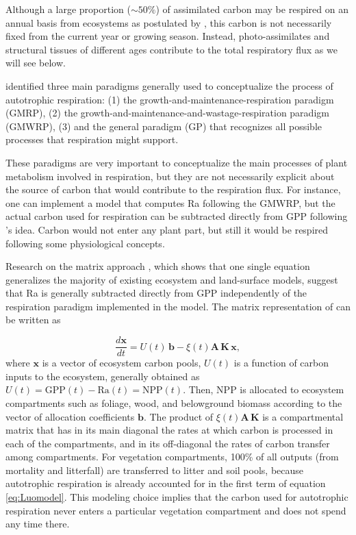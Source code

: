 \documentclass[12pt, a4paper]{article}
\begin{document}
Although a large proportion ($\sim 50\%$) of assimilated carbon may be respired on an annual basis from ecosystems as postulated by \citet{Waring1998}, this carbon is not necessarily fixed from the current year or growing season. Instead, photo-assimilates and structural tissues of different ages contribute to the total respiratory flux as we will see below.

\citet{Amthor2000} identified three main paradigms generally used to conceptualize the process of autotrophic respiration: (1) the growth-and-maintenance-respiration paradigm (GMRP), (2) the growth-and-maintenance-and-wastage-respiration paradigm (GMWRP), (3) and the general paradigm (GP) that recognizes all possible processes that respiration might support. 

These paradigms are very important to conceptualize the main processes of plant metabolism involved in respiration, but they are not necessarily explicit about the source of carbon that would contribute to the respiration flux. For instance, one can implement a model that computes Ra following the GMWRP, but the actual carbon used for respiration can be subtracted directly from GPP following \citeauthor{Waring1998}'s \citeyearpar{Waring1998} idea. Carbon would not enter any plant part, but still it would be respired following some physiological concepts. 

Research on the matrix approach \citep{Luo2017}, which shows that one single equation generalizes the majority of existing ecosystem and land-surface models, suggest that Ra is generally subtracted directly from GPP independently of the respiration paradigm implemented in the model.
The matrix representation of \citet{Luo2017} can be written as

\begin{equation} \label{eq:Luomodel}
\frac{d \bm{x}}{dt} =  U(t) \, \bm{b} - \xi(t) \mathbf{A} \, \mathbf{K} \, \bm{x},
\end{equation}
where $\bm{x}$ is a vector of ecosystem carbon pools, $U(t)$ is a function of carbon inputs to the ecosystem, generally obtained as $U(t) = \mathrm{GPP}(t) - \mathrm{Ra}(t) = \mathrm{NPP}(t)$. Then, NPP is allocated to ecosystem compartments such as foliage, wood, and belowground biomass according to the vector of allocation coefficients $\bm{b}$. The product of $\xi(t) \mathbf{A} \, \mathbf{K}$ is a compartmental matrix that has in its main diagonal the rates at which carbon is processed in each of the compartments, and in its off-diagonal the rates of carbon transfer among compartments. For vegetation compartments, 100\% of all outputs (from mortality and litterfall) are transferred to litter and soil pools, because autotrophic  respiration is already accounted for in the first term of  equation \eqref{eq:Luomodel}. This modeling choice implies that the carbon used for autotrophic respiration never enters a particular vegetation compartment and does not spend any time there.
\end{document}
